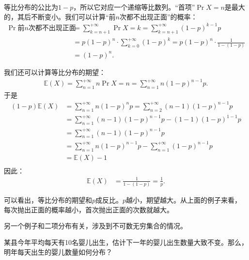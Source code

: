 \documentclass[12pt,UTF8]{ctexbook}
\begin{document}
等比分布的公比为$1 - p$，所以它对应一个递缩等比数列。“首项”$\Pr{X=n}$是最大的，其后不断变小。我们可以计算“前$n$次都不出现正面”的概率：
\begin{align*}
    \Pr{\mbox{前}n\mbox{次都不出现正面}} &= \sum_{k=n+1}^{+\infty} \Pr{X=k} = \sum_{k=n+1}^{+\infty} (1 - p)^{k-1}p\\ 
    &= p(1 - p)^{n}\cdot \sum_{k=0}^{+\infty} (1 - p)^k = p(1 - p)^{n}\cdot \frac{1}{1 - (1 - p)} \\
    &= (1 - p)^{n}.
\end{align*}

我们还可以计算等比分布的期望：
\begin{align*}
    \mathbb{E}(X) = \sum_{n=1}^{+\infty} n \Pr{X=n} = \sum_{n=1}^{+\infty} n(1 - p)^{n-1} p.
\end{align*}
于是
\begin{align*}
    (1 - p)\mathbb{E}(X) &=\sum_{n=1}^{+\infty} n(1 - p)^{n} p = \sum_{n=2}^{+\infty} (n - 1)(1 - p)^{n-1} p \\
    &= \sum_{n=1}^{+\infty} (n - 1)(1 - p)^{n-1} p - (1 - 1)(1 - p)^{1-1} p \\ 
    &= \sum_{n=1}^{+\infty} (n - 1)(1 - p)^{n-1} p \\
    &= \sum_{n=1}^{+\infty} n(1 - p)^{n-1} p - \sum_{n=1}^{+\infty} (1 - p)^{n-1} p \\
    &= \mathbb{E}(X) - 1 \\
\end{align*}
因此：
\begin{align*}
    \mathbb{E}(X) &= \frac{1}{1 - (1 - p)} = \frac{1}{p}.
\end{align*}

可以看出，等比分布的期望和$p$成反比。$p$越小，期望越大。从上面的例子来看，每次抛出正面的概率越小，首次抛出正面的次数就越大。

另一个例子和二项分布有关，涉及到不可数无穷集合的情况。

\begin{ex}
    某县今年平均每天有10名婴儿出生，估计下一年的婴儿出生数量大致不变。那么，明年每天出生的婴儿数量如何分布？
\end{ex}
\end{document}

